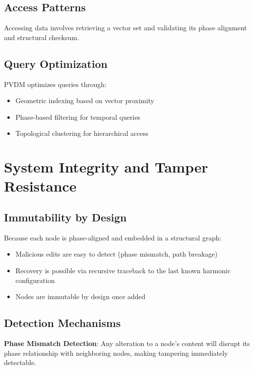 \documentclass[12pt,a4paper]{article}
\begin{document}
\subsection{Access Patterns}

Accessing data involves retrieving a vector set and validating its phase alignment and structural checksum.

\subsection{Query Optimization}

PVDM optimizes queries through:
\begin{itemize}
    \item Geometric indexing based on vector proximity
    \item Phase-based filtering for temporal queries
    \item Topological clustering for hierarchical access
\end{itemize}

\section{System Integrity and Tamper Resistance}

\subsection{Immutability by Design}

Because each node is phase-aligned and embedded in a structural graph:

\begin{itemize}
    \item Malicious edits are easy to detect (phase mismatch, path breakage)
    \item Recovery is possible via recursive traceback to the last known harmonic configuration
    \item Nodes are immutable by design once added
\end{itemize}

\subsection{Detection Mechanisms}

\textbf{Phase Mismatch Detection}: Any alteration to a node's content will disrupt its phase relationship with neighboring nodes, making tampering immediately detectable.
\end{document}
